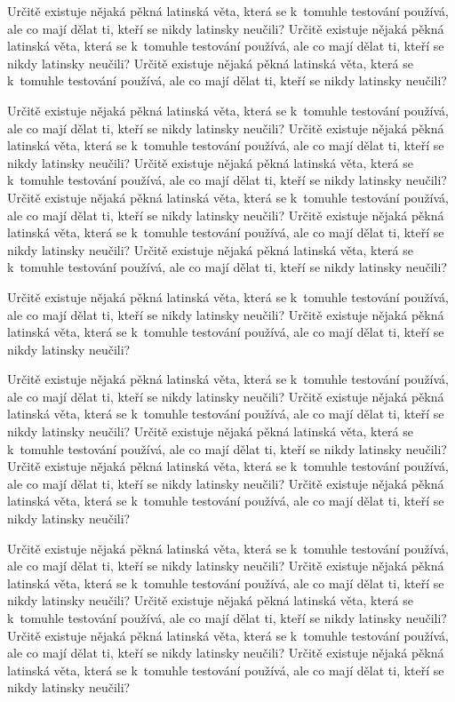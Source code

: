 \documentclass[11pt,twoside,a4paper]{book}
\begin{document}
Určitě existuje nějaká pěkná latinská věta, která se k~tomuhle testování používá, ale co mají dělat ti, kteří se nikdy
latinsky neučili? Určitě existuje nějaká pěkná latinská věta, která se k~tomuhle testování používá, ale co mají dělat
ti, kteří se nikdy latinsky neučili? Určitě existuje nějaká pěkná latinská věta, která se k~tomuhle testování používá,
ale co mají dělat ti, kteří se nikdy latinsky neučili?

Určitě existuje nějaká pěkná latinská věta, která se k~tomuhle testování používá, ale co mají dělat ti, kteří se nikdy
latinsky neučili? Určitě existuje nějaká pěkná latinská věta, která se k~tomuhle testování používá, ale co mají dělat
ti, kteří se nikdy latinsky neučili? Určitě existuje nějaká pěkná latinská věta, která se k~tomuhle testování používá,
ale co mají dělat ti, kteří se nikdy latinsky neučili? Určitě existuje nějaká pěkná latinská věta, která se k~tomuhle
testování používá, ale co mají dělat ti, kteří se nikdy latinsky neučili? Určitě existuje nějaká pěkná latinská věta,
která se k~tomuhle testování používá, ale co mají dělat ti, kteří se nikdy latinsky neučili? Určitě existuje nějaká
pěkná latinská věta, která se k~tomuhle testování používá, ale co mají dělat ti, kteří se nikdy latinsky neučili?

Určitě existuje nějaká pěkná latinská věta, která se k~tomuhle testování používá, ale co mají dělat ti, kteří se nikdy
latinsky neučili? Určitě existuje nějaká pěkná latinská věta, která se k~tomuhle testování používá, ale co mají dělat
ti, kteří se nikdy latinsky neučili?

Určitě existuje nějaká pěkná latinská věta, která se k~tomuhle testování používá, ale co mají dělat ti, kteří se nikdy
latinsky neučili? Určitě existuje nějaká pěkná latinská věta, která se k~tomuhle testování používá, ale co mají dělat
ti, kteří se nikdy latinsky neučili? Určitě existuje nějaká pěkná latinská věta, která se k~tomuhle testování používá,
ale co mají dělat ti, kteří se nikdy latinsky neučili? Určitě existuje nějaká pěkná latinská věta, která se k~tomuhle
testování používá, ale co mají dělat ti, kteří se nikdy latinsky neučili? Určitě existuje nějaká pěkná latinská věta,
která se k~tomuhle testování používá, ale co mají dělat ti, kteří se nikdy latinsky neučili?

Určitě existuje nějaká pěkná latinská věta, která se k~tomuhle testování používá, ale co mají dělat ti, kteří se nikdy
latinsky neučili? Určitě existuje nějaká pěkná latinská věta, která se k~tomuhle testování používá, ale co mají dělat
ti, kteří se nikdy latinsky neučili? Určitě existuje nějaká pěkná latinská věta, která se k~tomuhle testování používá,
ale co mají dělat ti, kteří se nikdy latinsky neučili? Určitě existuje nějaká pěkná latinská věta, která se k~tomuhle
testování používá, ale co mají dělat ti, kteří se nikdy latinsky neučili? Určitě existuje nějaká pěkná latinská věta,
která se k~tomuhle testování používá, ale co mají dělat ti, kteří se nikdy latinsky neučili?
\end{document}
